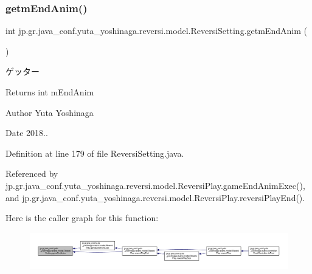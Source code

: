 \subsubsection{\texorpdfstring{getm\+End\+Anim()}{getmEndAnim()}}
{\footnotesize\ttfamily int jp.\+gr.\+java\+\_\+conf.\+yuta\+\_\+yoshinaga.\+reversi.\+model.\+Reversi\+Setting.\+getm\+End\+Anim (\begin{DoxyParamCaption}{ }\end{DoxyParamCaption})}



ゲッター 

\begin{DoxyReturn}{Returns}
int m\+End\+Anim 
\end{DoxyReturn}
\begin{DoxyAuthor}{Author}
Yuta Yoshinaga 
\end{DoxyAuthor}
\begin{DoxyDate}{Date}
2018.. 
\end{DoxyDate}


Definition at line 179 of file Reversi\+Setting.\+java.



Referenced by jp.\+gr.\+java\+\_\+conf.\+yuta\+\_\+yoshinaga.\+reversi.\+model.\+Reversi\+Play.\+game\+End\+Anim\+Exec(), and jp.\+gr.\+java\+\_\+conf.\+yuta\+\_\+yoshinaga.\+reversi.\+model.\+Reversi\+Play.\+reversi\+Play\+End().

Here is the caller graph for this function\+:
\nopagebreak
\begin{figure}[H]
\begin{center}
\leavevmode
\includegraphics[width=350pt]{classjp_1_1gr_1_1java__conf_1_1yuta__yoshinaga_1_1reversi_1_1model_1_1_reversi_setting_a96bbd11417e2c3fa781ea0c3ea570870_icgraph}
\end{center}
\end{figure}
\mbox{\label{classjp_1_1gr_1_1java__conf_1_1yuta__yoshinaga_1_1reversi_1_1model_1_1_reversi_setting_af0024a8f8f725a80ddbaa9cac751e555}} 

